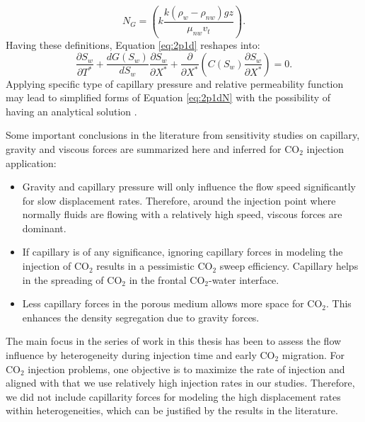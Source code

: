  \begin{equation}
  N_G=(k\frac{k(\rho_w-\rho_{nw})gz}{\mu_{nw}v_t}).
  \label{eq:Fn}
 \end{equation} Having these definitions, Equation \ref{eq:2p1d} reshapes into:
 \begin{equation}
  \frac{\partial S_w}{\partial T^*}+\frac{dG(S_w)}{dS_w}\frac{\partial
S_w}{\partial X^*}+\frac{\partial}{\partial X^*}\left( C(S_w)\frac{\partial
S_w}{\partial X^*}\right)=0.
  \label{eq:2p1dN}
 \end{equation} Applying specific type of capillary pressure and relative
permeability function may lead to simplified forms of Equation \ref{eq:2p1dN}
with the possibility of having an analytical
solution \cite{yortsos1983analytical}. 

Some important conclusions in the literature from sensitivity studies on
capillary, gravity and viscous forces are summarized here and inferred for
$\mbox{CO}_2$ injection application:

\begin{itemize}
 \item Gravity and capillary pressure will only influence the flow speed
significantly for slow displacement rates. Therefore, around the injection point where normally fluids are flowing with a relatively high speed, viscous forces are dominant.
 
 \item If capillary is of any significance, ignoring capillary forces in
modeling the injection of $\mbox{CO}_2$ results in a pessimistic $\mbox{CO}_2$
sweep efficiency. Capillary helps in the spreading of $\mbox{CO}_2$ in the
frontal $\mbox{CO}_2$-water interface.
 
 \item Less capillary forces in the porous medium allows more space for
$\mbox{CO}_2$. This enhances the density segregation due to gravity forces.
\end{itemize}

The main focus in the series of work in this thesis has been to assess the flow
influence by heterogeneity during injection time and early $\mbox{CO}_2$
migration. For $\mbox{CO}_2$ injection problems, one objective is to maximize
the rate of injection and aligned with that we use relatively high injection
rates in our studies. Therefore, we did not include capillarity forces for
modeling the high displacement rates within heterogeneities, which can be
justified by the results in the literature.


